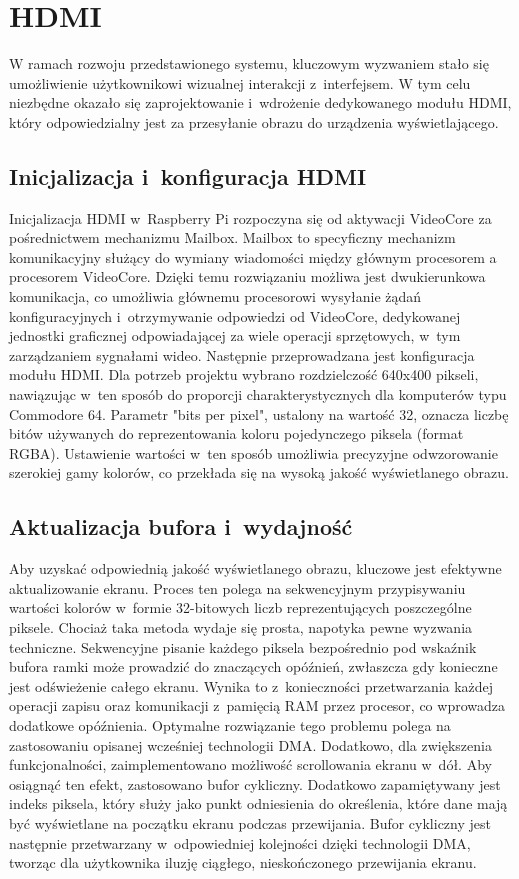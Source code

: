 \documentclass[shortabstract]{iithesis}
\begin{document}
\section{HDMI}
W ramach rozwoju przedstawionego systemu, kluczowym wyzwaniem stało się umożliwienie użytkownikowi wizualnej interakcji z~interfejsem. W tym celu niezbędne okazało się zaprojektowanie i~wdrożenie dedykowanego modułu HDMI, który odpowiedzialny jest za przesyłanie obrazu do urządzenia wyświetlającego.
\subsection{Inicjalizacja i~konfiguracja HDMI}
Inicjalizacja HDMI w~Raspberry Pi rozpoczyna się od aktywacji VideoCore za pośrednictwem mechanizmu Mailbox. Mailbox to specyficzny mechanizm komunikacyjny służący do wymiany wiadomości między głównym procesorem a procesorem VideoCore. Dzięki temu rozwiązaniu możliwa jest dwukierunkowa komunikacja, co umożliwia głównemu procesorowi wysyłanie żądań konfiguracyjnych i~otrzymywanie odpowiedzi od VideoCore, dedykowanej jednostki graficznej odpowiadającej za wiele operacji sprzętowych, w~tym zarządzaniem sygnałami wideo.
Następnie przeprowadzana jest konfiguracja modułu HDMI. Dla potrzeb projektu wybrano rozdzielczość 640x400 pikseli, nawiązując w~ten sposób do proporcji charakterystycznych dla komputerów typu Commodore 64. Parametr "bits per pixel", ustalony na wartość 32, oznacza liczbę bitów używanych do reprezentowania koloru pojedynczego piksela (format RGBA). Ustawienie wartości w~ten sposób umożliwia precyzyjne odwzorowanie szerokiej gamy kolorów, co przekłada się na wysoką jakość wyświetlanego obrazu.
\subsection{Aktualizacja bufora i~wydajność}
Aby uzyskać odpowiednią jakość wyświetlanego obrazu, kluczowe jest efektywne aktualizowanie ekranu. Proces ten polega na sekwencyjnym przypisywaniu wartości kolorów w~formie 32-bitowych liczb reprezentujących poszczególne piksele. Chociaż taka metoda wydaje się prosta, napotyka pewne wyzwania techniczne. Sekwencyjne pisanie każdego piksela bezpośrednio pod wskaźnik bufora ramki może prowadzić do znaczących opóźnień, zwłaszcza gdy konieczne jest odświeżenie całego ekranu. Wynika to z~konieczności przetwarzania każdej operacji zapisu oraz komunikacji z~pamięcią RAM przez procesor, co wprowadza dodatkowe opóźnienia. Optymalne rozwiązanie tego problemu polega na zastosowaniu opisanej wcześniej technologii DMA.
Dodatkowo, dla zwiększenia funkcjonalności, zaimplementowano możliwość scrollowania ekranu w~dół. Aby osiągnąć ten efekt, zastosowano bufor cykliczny. Dodatkowo zapamiętywany jest indeks piksela, który służy jako punkt odniesienia do określenia, które dane mają być wyświetlane na początku ekranu podczas przewijania. Bufor cykliczny jest następnie przetwarzany w~odpowiedniej kolejności dzięki technologii DMA, tworząc dla użytkownika iluzję ciągłego, nieskończonego przewijania ekranu.
\end{document}
